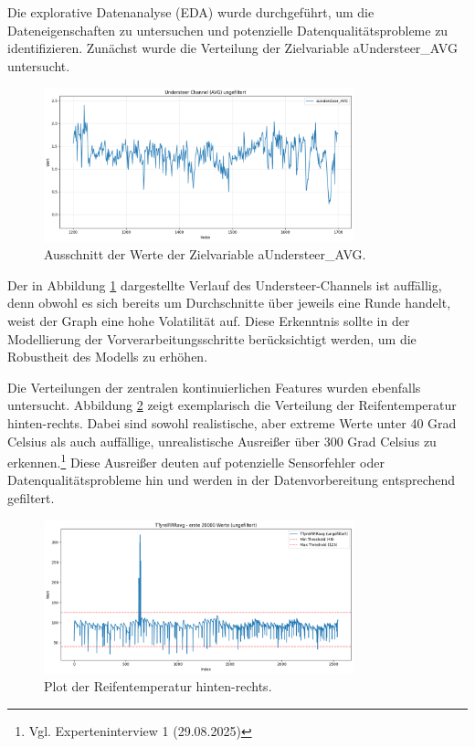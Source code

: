 Die explorative Datenanalyse (EDA) wurde durchgeführt, um die Dateneigenschaften zu untersuchen und potenzielle Datenqualitätsprobleme zu identifizieren. Zunächst wurde die Verteilung der Zielvariable aUndersteer\_AVG untersucht. 
\begin{figure}[H]
  \centering
  \includegraphics[width=0.8\textwidth]{graphics/understeer_nonfilt.png}
  \caption{Ausschnitt der Werte der Zielvariable aUndersteer\_AVG.}
  \label{fig:understeer_distribution}
\end{figure}
Der in Abbildung \ref{fig:understeer_distribution} dargestellte Verlauf des Understeer-Channels ist auffällig, denn obwohl es sich bereits um Durchschnitte über jeweils eine Runde handelt, weist der Graph eine hohe Volatilität auf.
Diese Erkenntnis sollte in der Modellierung der Vorverarbeitungsschritte berücksichtigt werden, um die Robustheit des Modells zu erhöhen.

Die Verteilungen der zentralen kontinuierlichen Features wurden ebenfalls untersucht. Abbildung \ref{fig:temp_distribution} zeigt exemplarisch die Verteilung der Reifentemperatur hinten-rechts. Dabei sind sowohl realistische, aber extreme Werte unter 40 Grad Celsius als auch auffällige, unrealistische Ausreißer über 300 Grad Celsius zu erkennen.\footnote{Vgl. Experteninterview 1 (29.08.2025)} Diese Ausreißer deuten auf potenzielle Sensorfehler oder Datenqualitätsprobleme hin und werden in der Datenvorbereitung entsprechend gefiltert.
\begin{figure}[H]
  \centering
  \includegraphics[width=0.8\textwidth]{graphics/TempPlot.png}
  \caption{Plot der Reifentemperatur hinten-rechts.}
  \label{fig:temp_distribution}
\end{figure}

